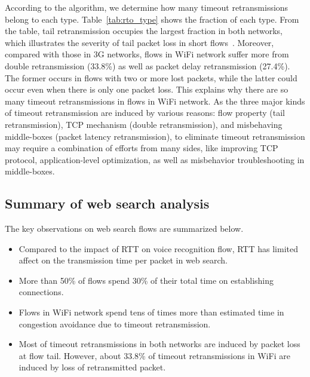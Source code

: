 According to the algorithm, we determine how many timeout retransmissions belong to each type. Table~\ref{tab:rto_type} shows the fraction of each type. From the table, tail retransmission occupies the largest fraction in both networks, which illustrates the severity of tail packet loss in short flows~\cite{flach2013reducing}. Moreover, compared with those in 3G networks, flows in WiFi network suffer more from double retransmission (33.8\%) as well as packet delay retransmission (27.4\%). The former occurs in flows with two or more lost packets, while the latter could occur even when there is only one packet loss. This explains why there are so many timeout retransmissions in flows in WiFi network. As the three major kinds of timeout retransmission are induced by various reasons: flow property (tail retransmission), TCP mechanism (double retransmission), and misbehaving middle-boxes (packet latency retransmission), to eliminate timeout retransmission may require a combination of efforts from many sides, like improving TCP protocol, application-level optimization, as well as misbehavior troubleshooting in middle-boxes.

\subsection{Summary of web search analysis}

The key observations on web search flows are summarized below.

\begin{itemize}
	\item Compared to the impact of RTT on voice recognition flow, RTT has limited affect on the transmission time per packet in web search.
	\item More than 50\% of flows spend 30\% of their total time on establishing connections.
	\item Flows in WiFi network spend tens of times more than estimated time in congestion avoidance due to timeout retransmission.
	\item Most of timeout retransmissions in both networks are induced by packet loss at flow tail. However, about 33.8\% of timeout retransmissions in WiFi are induced by loss of retransmitted packet.
\end{itemize}
